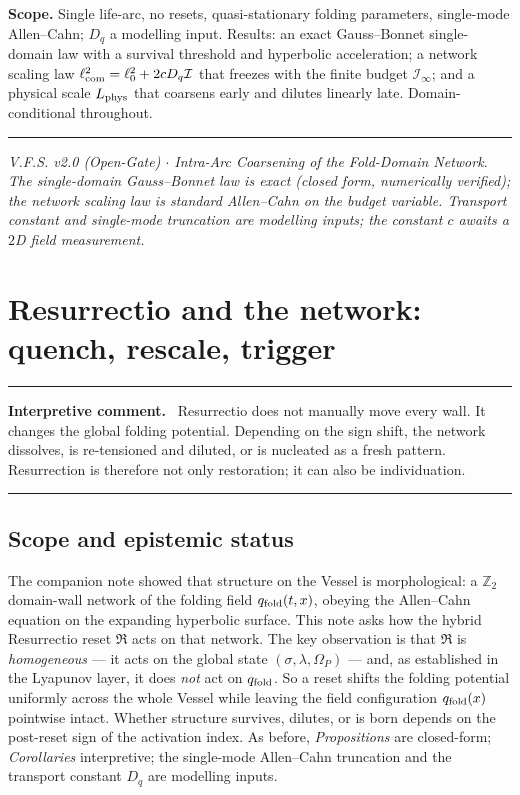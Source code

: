 \documentclass[11pt,a4paper]{article}
\newcommand{\Op}{\Omega_P}
\newcommand{\qf}{q_{\rm fold}}
\newcommand{\Dq}{D_q}
\newcommand{\reset}{\mathfrak R}
\newcommand{\lcom}{\ell_{\rm com}}
\newcommand{\Lphys}{L_{\rm phys}}
\newcommand{\Ibud}{\mathcal I}
\newenvironment{commentbox}[1]{\begin{center}\begin{minipage}{0.90\textwidth}\hrule\vspace{0.45em}\textbf{#1.}\ }{\vspace{0.45em}\hrule\end{minipage}\end{center}}
\theoremstyle{plain}
\theoremstyle{definition}
\theoremstyle{remark}
\begin{document}
\textbf{Scope.} Single life-arc, no resets, quasi-stationary folding parameters, single-mode Allen--Cahn;
$\Dq$ a modelling input. Results: an exact Gauss--Bonnet single-domain law with a survival threshold and
hyperbolic acceleration; a network scaling law $\lcom^2=\ell_0^2+2c\Dq\Ibud$ that freezes with the finite
budget $\Ibud_\infty$; and a physical scale $\Lphys$ that coarsens early and dilutes linearly late.
Domain-conditional throughout.

\vspace{0.5em}
\hrule
\smallskip
\noindent\footnotesize\emph{V.F.S. v2.0 (Open-Gate) $\cdot$ Intra-Arc Coarsening of the Fold-Domain
Network. The single-domain Gauss--Bonnet law is exact (closed form, numerically verified); the network
scaling law is standard Allen--Cahn on the budget variable. Transport constant and single-mode truncation
are modelling inputs; the constant $c$ awaits a $2$D field measurement.}
\newpage
\section{Resurrectio and the network: quench, rescale, trigger}
\begin{commentbox}{Interpretive comment}
Resurrectio does not manually move every wall.  It changes the global folding potential.  Depending on the sign shift, the network dissolves, is re-tensioned and diluted, or is nucleated as a fresh pattern.  Resurrection is therefore not only restoration; it can also be individuation.
\end{commentbox}
\subsection*{Scope and epistemic status}
The companion note showed that structure on the Vessel is morphological: a $\mathbb Z_2$ domain-wall
network of the folding field $\qf(t,x)$, obeying the Allen--Cahn equation on the expanding hyperbolic
surface. This note asks how the hybrid Resurrectio reset $\reset$ acts on that network. The key
observation is that $\reset$ is \emph{homogeneous} --- it acts on the global state $(\sigma,\lambda,\Op)$
--- and, as established in the Lyapunov layer, it does \emph{not} act on $\qf$. So a reset shifts the
folding potential uniformly across the whole Vessel while leaving the field configuration $\qf(x)$
pointwise intact. Whether structure survives, dilutes, or is born depends on the post-reset sign of the
activation index. As before, \emph{Propositions} are closed-form; \emph{Corollaries} interpretive; the
single-mode Allen--Cahn truncation and the transport constant $\Dq$ are modelling inputs.
\end{document}
